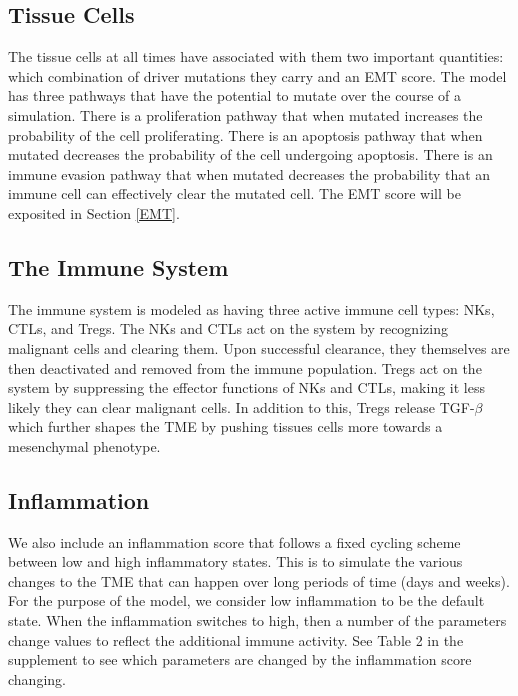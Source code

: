 \documentclass[11pt]{article}
\begin{document}
\subsection{Tissue Cells}\label{TissueCells}
The tissue cells at all times have associated with them two important quantities: which combination of driver mutations they carry and an EMT score.
The model has three pathways that have the potential to mutate over the course of a simulation.
There is a proliferation pathway that when mutated increases the probability of the cell proliferating.
There is an apoptosis pathway that when mutated decreases the probability of the cell undergoing apoptosis.
There is an immune evasion pathway that when mutated decreases the probability that an immune cell can effectively clear the mutated cell.
The EMT score will be exposited in Section \ref{EMT}. 

\subsection{The Immune System}\label{ImmuneSystem}
The immune system is modeled as having three active immune cell types: NKs, CTLs, and Tregs.
The NKs and CTLs act on the system by recognizing malignant cells and clearing them.
Upon successful clearance, they themselves are then deactivated and removed from the immune population.
Tregs act on the system by suppressing the effector functions of NKs and CTLs, making it less likely they can clear malignant cells.
In addition to this, Tregs release TGF-$\beta$ which further shapes the TME by pushing tissues cells more towards a mesenchymal phenotype.

\subsection{Inflammation} %
We also include an inflammation score that follows a fixed cycling scheme between low and high inflammatory states.
This is to simulate the various changes to the TME that can happen over long periods of time (days and weeks).
For the purpose of the model, we consider low inflammation to be the default state.
When the inflammation switches to high, then a number of the parameters change values to reflect the additional immune activity.
See Table 2 in the supplement to see which parameters are changed by the inflammation score changing. %
\end{document}
